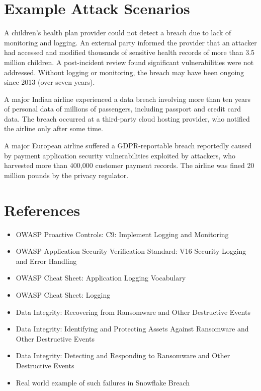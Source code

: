 \documentclass[11pt]{article}
\begin{document}
\section{Example Attack Scenarios}

\begin{scenario}
A children's health plan provider could not detect a breach due to lack of monitoring and logging. An external party informed the provider that an attacker had accessed and modified thousands of sensitive health records of more than 3.5 million children. A post-incident review found significant vulnerabilities were not addressed. Without logging or monitoring, the breach may have been ongoing since 2013 (over seven years).
\end{scenario}

\begin{scenario}
A major Indian airline experienced a data breach involving more than ten years of personal data of millions of passengers, including passport and credit card data. The breach occurred at a third-party cloud hosting provider, who notified the airline only after some time.
\end{scenario}

\begin{scenario}
A major European airline suffered a GDPR-reportable breach reportedly caused by payment application security vulnerabilities exploited by attackers, who harvested more than 400{,}000 customer payment records. The airline was fined 20 million pounds by the privacy regulator.
\end{scenario}

\section{References}
\begin{itemize}
  \item OWASP Proactive Controls: C9: Implement Logging and Monitoring
  \item OWASP Application Security Verification Standard: V16 Security Logging and Error Handling
  \item OWASP Cheat Sheet: Application Logging Vocabulary
  \item OWASP Cheat Sheet: Logging
  \item Data Integrity: Recovering from Ransomware and Other Destructive Events
  \item Data Integrity: Identifying and Protecting Assets Against Ransomware and Other Destructive Events
  \item Data Integrity: Detecting and Responding to Ransomware and Other Destructive Events
  \item Real world example of such failures in Snowflake Breach
\end{itemize}
\end{document}
